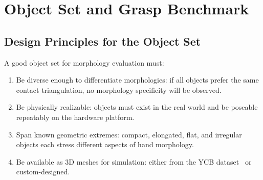 \documentclass[journal]{IEEEtran}
\begin{document}
\begin{table}[t]
  \centering
  \caption{Simulation Stack Components and Their Roles}
  \label{tab:simstack}
\end{table}

\section{Object Set and Grasp Benchmark}
\label{sec:objects}

\subsection{Design Principles for the Object Set}

A good object set for morphology evaluation must:
\begin{enumerate}
  \item Be diverse enough to differentiate morphologies: if all objects prefer the same
    contact triangulation, no morphology specificity will be observed.
  \item Be physically realizable: objects must exist in the real world and be poseable
    repeatably on the hardware platform.
  \item Span known geometric extremes: compact, elongated, flat, and irregular objects
    each stress different aspects of hand morphology.
  \item Be available as 3D meshes for simulation: either from the YCB dataset~\cite{ycb2017}
    or custom-designed.
\end{enumerate}
\end{document}
